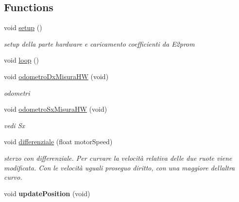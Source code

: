 \subsection*{Functions}
\begin{DoxyCompactItemize}
\item 
\mbox{\label{ari_pi__2_d_c__esp__08_8ino_a4fc01d736fe50cf5b977f755b675f11d}} 
void \mbox{\hyperlink{ari_pi__2_d_c__esp__08_8ino_a4fc01d736fe50cf5b977f755b675f11d}{setup}} ()
\begin{DoxyCompactList}\small\item\em setup della parte hardware e caricamento coefficienti da E2prom \end{DoxyCompactList}\item 
void \mbox{\hyperlink{ari_pi__2_d_c__esp__08_8ino_afe461d27b9c48d5921c00d521181f12f}{loop}} ()
\item 
void \mbox{\hyperlink{ari_pi__2_d_c__esp__08_8ino_a6af06b46b74b5a44e1adc270e1e07e6b}{odometro\+Dx\+Misura\+HW}} (void)
\begin{DoxyCompactList}\small\item\em odometri \end{DoxyCompactList}\item 
\mbox{\label{ari_pi__2_d_c__esp__08_8ino_aef8d9e68883244c4d12fb9dfb14b0b2e}} 
void \mbox{\hyperlink{ari_pi__2_d_c__esp__08_8ino_aef8d9e68883244c4d12fb9dfb14b0b2e}{odometro\+Sx\+Misura\+HW}} (void)
\begin{DoxyCompactList}\small\item\em vedi Sx \end{DoxyCompactList}\item 
void \mbox{\hyperlink{ari_pi__2_d_c__esp__08_8ino_af117273d2066fa1917036ae9a9742ae7}{differenziale}} (float motor\+Speed)
\begin{DoxyCompactList}\small\item\em sterzo con differenziale. Per curvare la velocità relativa delle due ruote viene modificata. Con le velocità uguali proseguo diritto, con una maggiore dell\textquotesingle{}altra curvo. \end{DoxyCompactList}\item 
\mbox{\label{ari_pi__2_d_c__esp__08_8ino_a1961cf99cc4edb6f9f48ea4b3ec3112c}} 
void {\bfseries update\+Position} (void)
\item 

\end{DoxyCompactItemize}
